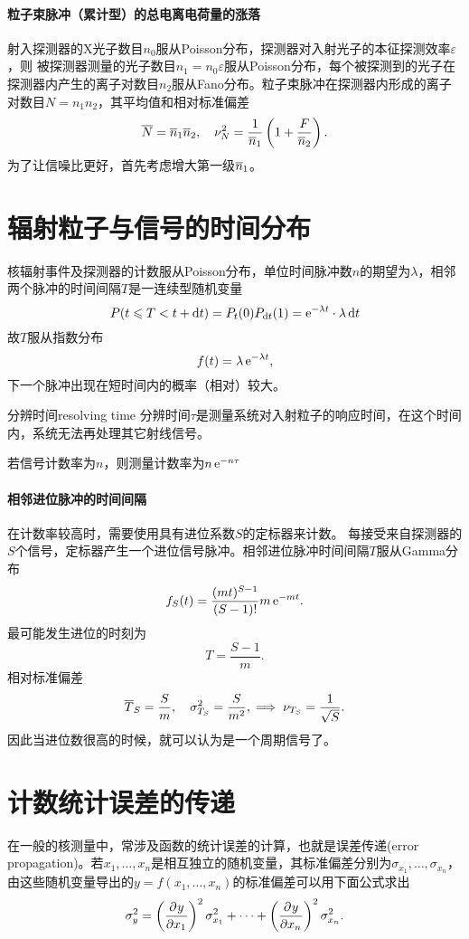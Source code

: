 \paragraph{粒子束脉冲（累计型）的总电离电荷量的涨落}
射入探测器的X光子数目$n_0$服从Poisson分布，探测器对入射光子的本征探测效率$\varepsilon$，则
被探测器测量的光子数目$n_1=n_0\varepsilon$服从Poisson分布，每个被探测到的光子在探测器内产生的离子对数目$n_2$服从Fano分布。粒子束脉冲在探测器内形成的离子对数目$N=n_1n_2$，其平均值和相对标准偏差
\[
	\overline{N}=\overline{n}_1\overline{n}_2,\quad\nu_N^2=\frac1{\overline{n}_1}\left(1+\frac F{\overline{n}_2}\right).
\]
为了让信噪比更好，首先考虑增大第一级$\overline{n}_1$。

\section{辐射粒子与信号的时间分布}

核辐射事件及探测器的计数服从Poisson分布，单位时间脉冲数$n$的期望为$\lambda$，相邻两个脉冲的时间间隔$T$是一连续型随机变量
\[
	P(t\leqslant T<t+\mathop{}\!\mathrm{d} t)=P_t(0)P_{\mathop{}\!\mathrm{d} t}(1)=\mathop{}\!\mathrm{e}^{-\lambda t}\cdot \lambda\mathop{}\!\mathrm{d} t
\]
故$T$服从指数分布
\[
	f(t)=\lambda\mathop{}\!\mathrm{e}^{-\lambda t},
\]
下一个脉冲出现在短时间内的概率（相对）较大。
\begin{definition}{分辨时间}{resolving time}
	分辨时间$\tau$是测量系统对入射粒子的响应时间，在这个时间内，系统无法再处理其它射线信号。
\end{definition}
若信号计数率为$n$，则测量计数率为$n\mathop{}\!\mathrm{e}^{-n\tau}$
\paragraph{相邻进位脉冲的时间间隔}
在计数率较高时，需要使用具有进位系数$S$的定标器来计数。
每接受来自探测器的$S$个信号，定标器产生一个进位信号脉冲。相邻进位脉冲时间间隔$T$服从Gamma分布
\[
	f_S(t)=\frac{(mt)^{S-1}}{(S-1)!}m\mathop{}\!\mathrm{e}^{-mt}.
\]
最可能发生进位的时刻为
\[
	T=\frac{S-1}m.
\]
相对标准偏差
\[
	\overline{T}_S=\frac Sm,\quad\sigma_{T_S}^2=\frac S{m^2},\implies\nu_{T_S}=\frac1{\sqrt S}.
\]
因此当进位数很高的时候，就可以认为是一个周期信号了。

\section{计数统计误差的传递}

在一般的核测量中，常涉及函数的统计误差的计算，也就是误差传递(error propagation)。若$x_1,\ldots,x_n$是相互独立的随机变量，其标准偏差分别为$\sigma_{x_1},\ldots,\sigma_{x_n}$，由这些随机变量导出的$y=f(x_1,\ldots,x_n)$的标准偏差可以用下面公式求出
\[
	\sigma_y^2=\left(\frac{\partial^{{}}y}{\partial{x_1}^{{}}}\right)^2\sigma_{x_1}^2+\cdots+\left(\frac{\partial^{{}}y}{\partial{x_n}^{{}}}\right)^2\sigma_{x_n}^2.
\]
